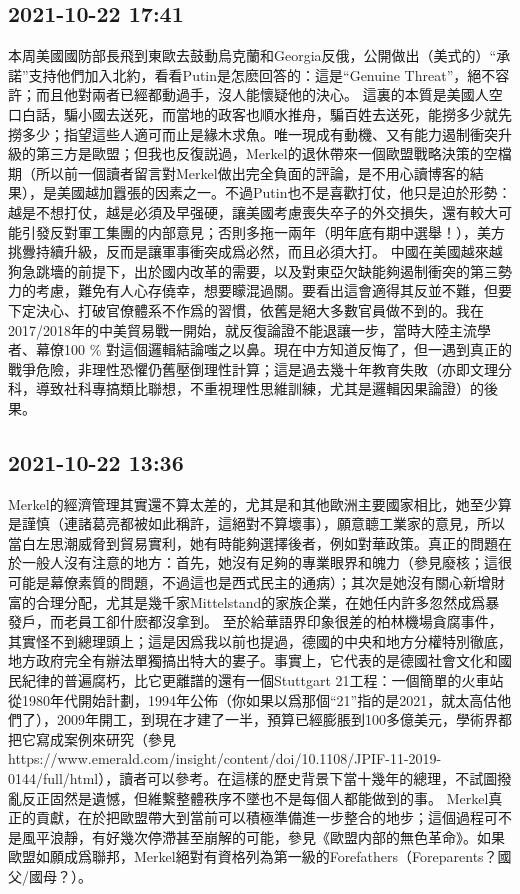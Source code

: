 \documentclass[twocolumn]{ctexart}
\begin{document}
\subsection*{2021-10-22 17:41}

本周美國國防部長飛到東歐去鼓動烏克蘭和Georgia反俄，公開做出（美式的）“承諾”支持他們加入北約，看看Putin是怎麽回答的：這是“Genuine Threat”，絕不容許；而且他對兩者已經都動過手，沒人能懷疑他的決心。
這裏的本質是美國人空口白話，騙小國去送死，而當地的政客也順水推舟，騙百姓去送死，能撈多少就先撈多少；指望這些人適可而止是緣木求魚。唯一現成有動機、又有能力遏制衝突升級的第三方是歐盟；但我也反復説過，Merkel的退休帶來一個歐盟戰略決策的空檔期（所以前一個讀者留言對Merkel做出完全負面的評論，是不用心讀博客的結果），是美國越加囂張的因素之一。不過Putin也不是喜歡打仗，他只是迫於形勢：越是不想打仗，越是必須及早强硬，讓美國考慮喪失卒子的外交損失，還有較大可能引發反對軍工集團的内部意見；否則多拖一兩年（明年底有期中選舉！），美方挑釁持續升級，反而是讓軍事衝突成爲必然，而且必須大打。
中國在美國越來越狗急跳墻的前提下，出於國内改革的需要，以及對東亞欠缺能夠遏制衝突的第三勢力的考慮，難免有人心存僥幸，想要矇混過關。要看出這會適得其反並不難，但要下定決心、打破官僚體系不作爲的習慣，依舊是絕大多數官員做不到的。我在2017/2018年的中美貿易戰一開始，就反復論證不能退讓一步，當時大陸主流學者、幕僚100 \% 對這個邏輯結論嗤之以鼻。現在中方知道反悔了，但一遇到真正的戰爭危險，非理性恐懼仍舊壓倒理性計算；這是過去幾十年教育失敗（亦即文理分科，導致社科專搞類比聯想，不重視理性思維訓練，尤其是邏輯因果論證）的後果。
\subsection*{2021-10-22 13:36}

Merkel的經濟管理其實還不算太差的，尤其是和其他歐洲主要國家相比，她至少算是謹慎（連諸葛亮都被如此稱許，這絕對不算壞事），願意聼工業家的意見，所以當白左思潮威脅到貿易實利，她有時能夠選擇後者，例如對華政策。真正的問題在於一般人沒有注意的地方：首先，她沒有足夠的專業眼界和魄力（參見廢核；這很可能是幕僚素質的問題，不過這也是西式民主的通病）；其次是她沒有關心新增財富的合理分配，尤其是幾千家Mittelstand的家族企業，在她任内許多忽然成爲暴發戶，而老員工卻什麽都沒拿到。
至於給華語界印象很差的柏林機場貪腐事件，其實怪不到總理頭上；這是因爲我以前也提過，德國的中央和地方分權特別徹底，地方政府完全有辦法單獨搞出特大的婁子。事實上，它代表的是德國社會文化和國民紀律的普遍腐朽，比它更離譜的還有一個Stuttgart 21工程：一個簡單的火車站從1980年代開始計劃，1994年公佈（你如果以爲那個“21”指的是2021，就太高估他們了），2009年開工，到現在才建了一半，預算已經膨脹到100多億美元，學術界都把它寫成案例來研究（參見https://www.emerald.com/insight/content/doi/10.1108/JPIF-11-2019-0144/full/html），讀者可以參考。在這樣的歷史背景下當十幾年的總理，不試圖撥亂反正固然是遺憾，但維繫整體秩序不墜也不是每個人都能做到的事。
Merkel真正的貢獻，在於把歐盟帶大到當前可以積極準備進一步整合的地步；這個過程可不是風平浪靜，有好幾次停滯甚至崩解的可能，參見《歐盟内部的無色革命》。如果歐盟如願成爲聯邦，Merkel絕對有資格列為第一級的Forefathers（Foreparents？國父/國母？）。
\end{document}
